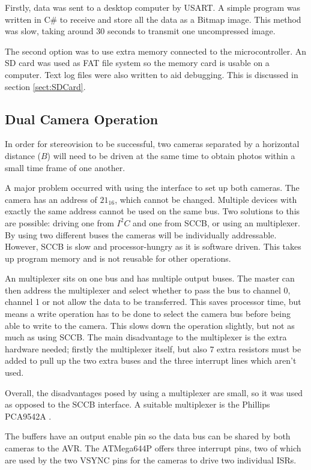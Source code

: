 Firstly, data was sent to a desktop computer by USART. A simple program was written in C\# to receive and store all the data as a Bitmap image. This method was slow, taking around 30 seconds to transmit one uncompressed image. 

The second option was to use extra memory connected to the microcontroller. An SD card was used as FAT file system so the memory card is usable on a computer. Text log files were also written to aid debugging. This is discussed in section \ref{sect:SDCard}. 

\subsection{Dual Camera Operation}
In order for stereovision to be successful, two cameras separated by a horizontal distance ($B$) will need to be driven at the same time to obtain photos within a small time frame of one another.

A major problem occurred with using the \itc interface to set up both cameras. The camera has an \itc address of $21_{16}$, which cannot be changed. Multiple \itc devices with exactly the same address cannot be used on the same bus. 
Two solutions to this are possible: driving one from $I^{2}C$ and one from SCCB, or using an \itc multiplexer. By using two different buses the cameras will be individually addressable. However, SCCB is slow and processor-hungry as it is software driven. This takes up program memory and is not reusable for other operations.

An \itc multiplexer sits on one \itc bus and has multiple output buses. The master can then address the multiplexer and select whether to pass the bus to channel 0, channel 1 or not allow the data to be transferred. This saves processor time, but means a write operation has to be done to select the camera bus before being able to write to the camera. This slows down the operation slightly, but not as much as using SCCB. The main disadvantage to the \itc multiplexer is the extra hardware needed; firstly the multiplexer itself, but also 7 extra resistors must be added to pull up the two extra buses and the three interrupt lines which aren't used.

Overall, the disadvantages posed by using a multiplexer are small, so it was used as opposed to the SCCB interface. A suitable multiplexer is the Phillips PCA9542A \citep{I2C_Mux}.

The buffers have an output enable pin so the data bus can be shared by both cameras to the AVR. The ATMega644P offers three interrupt pins, two of which are used by the two VSYNC pins for the cameras to drive two individual ISRs. 

